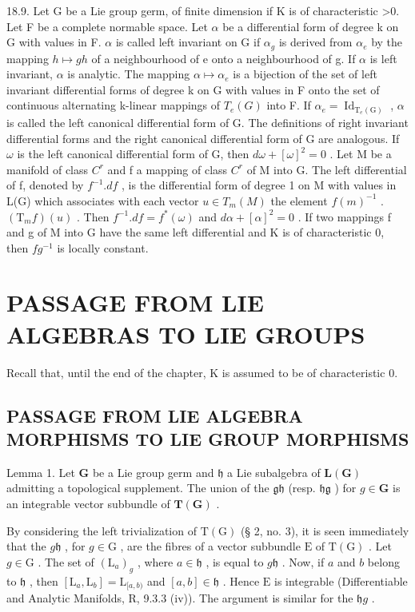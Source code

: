 18.9. Let G be a Lie group germ, of finite dimension if K is of characteristic \textgreater0. Let F be a complete normable space. Let \(\alpha\) be a differential form of degree k on G with values in F. \(\alpha\) is called left invariant on G if \(\alpha_{g}\) is derived from \(\alpha_{e}\) by the mapping \(h \mapsto gh\) of a neighbourhood of e onto a neighbourhood of g. If \(\alpha\) is left invariant, \(\alpha\) is analytic. The mapping \(\alpha \mapsto \alpha_{e}\) is a bijection of the set of left invariant differential forms of degree k on G with values in F onto the set of continuous alternating k-linear mappings of \(T_{e}(G)\) into F. If \(\alpha_{e} = \operatorname{Id}_{\mathrm{T}_e(\mathrm{G})}\) , \(\alpha\) is called the left canonical differential form of G. The definitions of right invariant differential forms and the right canonical differential form of G are analogous. If \(\omega\) is the left canonical differential form of G, then \(d\omega + [\omega]^{2} = 0\) . Let M be a manifold of class \(C^{r}\) and f a mapping of class \(C^{r}\) of M into G. The left differential of f, denoted by \(f^{-1}.df\) , is the differential form of degree 1 on M with values in L(G) which associates with each vector \(u \in T_{m}(M)\) the element \(f(m)^{-1}\) . \((\mathrm{T}_{m}f)(u)\) . Then \(f^{-1}.df = f^{*}(\omega)\) and \(d\alpha + [\alpha]^{2} = 0\) . If two mappings f and g of M into G have the same left differential and K is of characteristic 0, then \(fg^{-1}\) is locally constant.

\section{PASSAGE FROM LIE ALGEBRAS TO LIE GROUPS}

Recall that, until the end of the chapter, K is assumed to be of characteristic 0.

\subsection{PASSAGE FROM LIE ALGEBRA MORPHISMS TO LIE GROUP MORPHISMS}

Lemma 1. Let \(\mathbf{G}\) be a Lie group germ and \(\mathfrak{h}\) a Lie subalgebra of \(\mathbf{L}(\mathbf{G})\) admitting a topological supplement. The union of the \(\mathfrak{gh}\) (resp. \(\mathfrak{hg}\) ) for \(g\in\mathbf{G}\) is an integrable vector subbundle of \(\mathbf{T}(\mathbf{G})\) .

By considering the left trivialization of \(\mathrm{T}(\mathrm{G})\) (§ 2, no. 3), it is seen immediately that the \(g\mathfrak{h}\) , for \(g\in \mathrm{G}\) , are the fibres of a vector subbundle \(\mathrm{E}\) of \(\mathrm{T}(\mathrm{G})\) . Let \(g\in \mathrm{G}\) . The set of \((\mathrm{L}_a)_g\) , where \(a\in \mathfrak{h}\) , is equal to \(g\mathfrak{h}\) . Now, if \(a\) and \(b\) belong to \(\mathfrak{h}\) , then \([\mathrm{L}_a,\mathrm{L}_b] = \mathrm{L}_{[a,b)}\) and \([a,b]\in \mathfrak{h}\) . Hence \(\mathrm{E}\) is integrable (Differentiable and Analytic Manifolds, R, 9.3.3 (iv)). The argument is similar for the \(\mathfrak{h}g\) .


